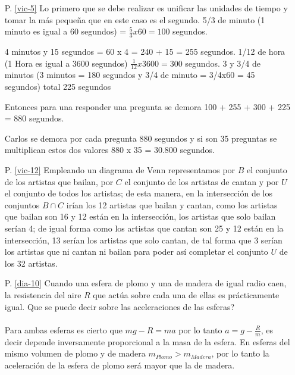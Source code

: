 \begin{itemize}


\item[P. \ref{vic-5}] Lo primero que se debe realizar es unificar las unidades de tiempo y tomar la más pequeña que en este caso es el segundo.
5/3 de minuto (1 minuto es igual a 60 segundos) = $\frac{5}{3	}x60=100$ segundos.

4 minutos y 15 segundos = 60 x 4 = 240 + 15 = 255 segundos.
 1/12 de hora (1 Hora es igual a 3600 segundos) $\frac{1}{12}x3600=300$ segundos.
3 y 3/4 de minutos (3 minutos = 180 segundos y 3/4 de minuto = 3/4x60 = 45 segundos)  total 225 segundos

Entonces para una responder una pregunta se demora 100 + 255 + 300 + 225 = 880 segundos.

Carlos se demora por cada pregunta 880 segundos y si son 35 preguntas se multiplican estos dos valores 
880 x 35  = 30.800 segundos.


\item[P. \ref{vic-12}] Empleando un diagrama de  Venn  representamos por $B$ el conjunto de los artistas que bailan, por  $C$  el conjunto de los artistas de cantan y por $U$ el conjunto de todos los artistas; de esta manera, en la intersección de los conjuntos $B\cap C$ irían los 12 artistas que bailan y cantan, como los artistas que bailan son 16 y 12 están en la intersección, los artistas que solo bailan serían 4; de igual forma como los artistas que cantan son 25 y 12 están en la intersección, 13 serían los artistas que solo cantan, de tal forma que 3 serían los artistas que ni cantan ni bailan para poder así completar el conjunto $U$ de los 32 artistas.


\item[P. \ref{dia-10}] Cuando una esfera de plomo y una de madera de igual radio caen, la resistencia del aire $R$ que actúa sobre cada una de ellas es prácticamente igual. Que se puede decir sobre las aceleraciones de las esferas?\\ \\
Para ambas esferas es cierto que $mg-R=ma$ por lo tanto $a=g-\frac{R}{m}$, es decir depende inversamente proporcional a la masa de la esfera. En esferas del mismo volumen de plomo y de madera $m_{Plomo}>m_{Madera}$, por lo tanto la aceleración de la esfera de plomo será mayor que la de madera.


\end{itemize}
